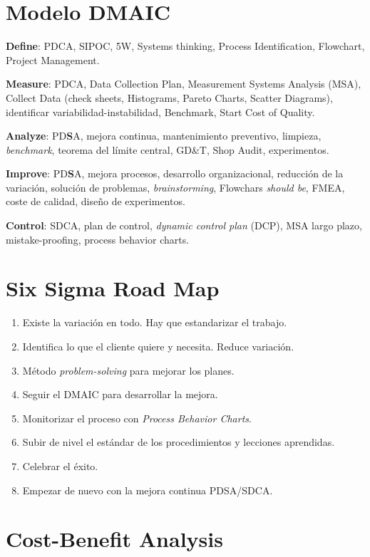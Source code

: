 \documentclass[oneside]{book}
\begin{document}
\section{Modelo DMAIC}
\textbf{Define}: PDCA, SIPOC, 5W, Systems thinking, Process Identification, Flowchart, Project Management.

\textbf{Measure}: PDCA, Data Collection Plan, Measurement Systems Analysis (MSA), Collect Data (check sheets, Histograms, Pareto Charts, Scatter Diagrams), identificar variabilidad-instabilidad, Benchmark, Start Cost of Quality. 

\textbf{Analyze}: PD\textbf{S}A, mejora continua, mantenimiento preventivo, limpieza, \textit{benchmark}, teorema del límite central, GD\&T, Shop Audit, experimentos. 

\textbf{Improve}: PD\textbf{S}A, mejora procesos, desarrollo organizacional, reducción de la variación, solución de problemas, \textit{brainstorming}, Flowchars \textit{should be}, FMEA, coste de calidad, diseño de experimentos. 

\textbf{Control}: SDCA, plan de control, \textit{dynamic control plan} (DCP), MSA largo plazo, mistake-proofing, process behavior charts.

\section{Six Sigma Road Map}

\begin{enumerate}
	\item Existe la variación en todo. Hay que estandarizar el trabajo.
	\item Identifica lo que el cliente quiere y necesita. Reduce variación.
	\item Método \textit{problem-solving} para mejorar los planes.
	\item Seguir el DMAIC para desarrollar la mejora.
	\item Monitorizar el proceso con \textit{Process Behavior Charts}.
	\item Subir de nivel el estándar de los procedimientos y lecciones aprendidas.
	\item Celebrar el éxito.
	\item Empezar de nuevo con la mejora continua PDSA/SDCA.
\end{enumerate}

\section{Cost-Benefit Analysis}
\end{document}
